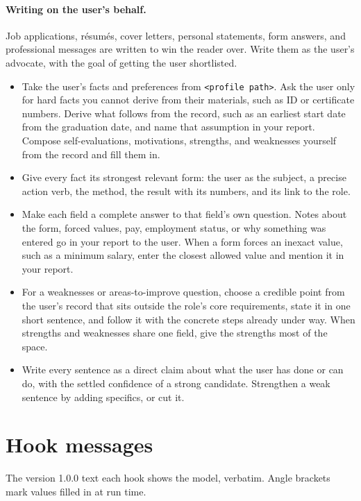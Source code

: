 {\paragraph{Writing on the user's behalf.} Job applications, r\'esum\'es, cover letters, personal statements, form answers, and professional messages are written to win the reader over. Write them as the user's advocate, with the goal of getting the user shortlisted.
\begin{itemize}
\item Take the user's facts and preferences from \texttt{<profile path>}. Ask the user only for hard facts you cannot derive from their materials, such as ID or certificate numbers. Derive what follows from the record, such as an earliest start date from the graduation date, and name that assumption in your report. Compose self-evaluations, motivations, strengths, and weaknesses yourself from the record and fill them in.
\item Give every fact its strongest relevant form: the user as the subject, a precise action verb, the method, the result with its numbers, and its link to the role.
\item Make each field a complete answer to that field's own question. Notes about the form, forced values, pay, employment status, or why something was entered go in your report to the user. When a form forces an inexact value, such as a minimum salary, enter the closest allowed value and mention it in your report.
\item For a weaknesses or areas-to-improve question, choose a credible point from the user's record that sits outside the role's core requirements, state it in one short sentence, and follow it with the concrete steps already under way. When strengths and weaknesses share one field, give the strengths most of the space.
\item Write every sentence as a direct claim about what the user has done or can do, with the settled confidence of a strong candidate. Strengthen a weak sentence by adding specifics, or cut it.
\end{itemize}
}

\section{Hook messages}
\label{app:hooks}

The version 1.0.0 text each hook shows the model, verbatim. Angle brackets mark values filled in at run time.

